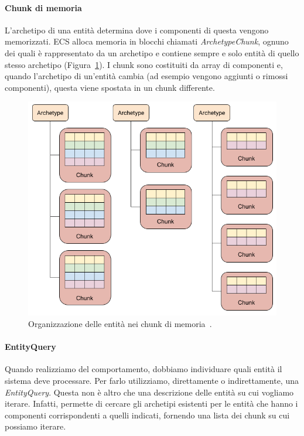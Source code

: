 \paragraph{Chunk di memoria}
L'archetipo di una entità determina dove i componenti di questa vengono memorizzati. ECS alloca memoria in blocchi chiamati \emph{ArchetypeChunk}, ognuno dei quali è rappresentato da un archetipo e contiene sempre e solo entità di quello stesso archetipo (Figura~\ref{fig:memory-chunk}). I chunk sono costituiti da array di componenti e, quando l'archetipo di un'entità cambia (ad esempio vengono aggiunti o rimossi componenti), questa viene spostata in un chunk differente.

\begin{figure}[!ht]
    \centering
    \includegraphics[width=0.85\columnwidth]{gfx/imgs/chapter2/ArchetypeChunkDiagramENG.png}
    \caption{Organizzazione delle entità nei chunk di memoria~\cite{doc:unity-entities-manual}.}
    \label{fig:memory-chunk}
\end{figure}

\paragraph{EntityQuery}

Quando realizziamo del comportamento, dobbiamo individuare quali entità il sistema deve processare. Per farlo utilizziamo, direttamente o indirettamente, una \emph{EntityQuery}. Questa non è altro che una descrizione delle entità su cui vogliamo iterare. Infatti, permette di cercare gli archetipi esistenti per le entità che hanno i componenti corrispondenti a quelli indicati, fornendo una lista dei chunk su cui possiamo iterare.

